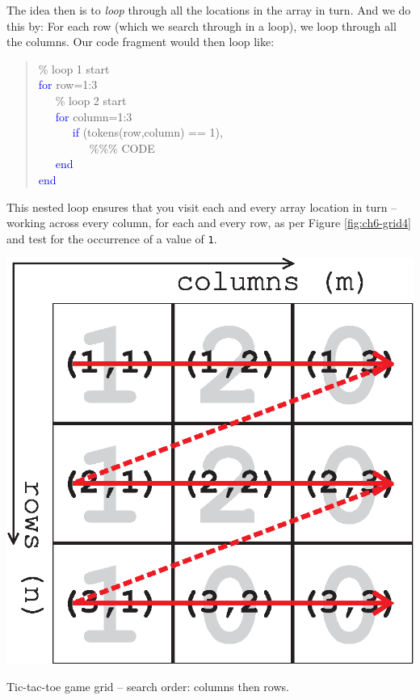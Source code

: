 \documentclass{tufte-book} %
\newenvironment{docspec}{\begin{quotation}\ttfamily\parskip0pt\parindent0pt\ignorespaces}{\end{quotation}}
\begin{document}
The idea then is to \textit{loop} through all the locations in the array in turn. And we do this by: For each row (which we search through in a loop), we loop through all the columns. Our code fragment would then loop like:
\begin{docspec}
\textcolor[rgb]{0,0.501961,0}{\% loop 1 start\\}
\textcolor{blue}{for} row=1:3\\
\ \ \ \textcolor[rgb]{0,0.501961,0}{\% loop 2 start\\}
\ \ \ \textcolor{blue}{for} column=1:3\\
\ \ \ \ \ \ \textcolor{blue}{if} (tokens(row,column) == 1),\\
\ \ \ \ \ \ \ \ \ \textcolor[rgb]{0,0.501961,0}{\%\%\% CODE}\\
\ \ \ \textcolor{blue}{end}\\
\textcolor{blue}{end}
\end{docspec}
This nested loop ensures that you  visit each and every array location in turn -- working across every column, for each and every row, as per Figure \ref{fig:ch6-grid4} and test for the occurrence of a value of \texttt{1}.

\begin{marginfigure}[0.0in]
\includegraphics[width=\linewidth]{ch6-grid4.eps}
\caption{Tic-tac-toe game grid -- search order: columns then rows.}
\label{fig:ch6-grid4}
\end{marginfigure}
\end{document}
